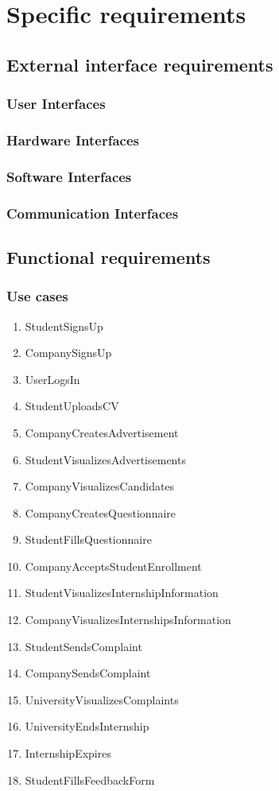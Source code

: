 \chapter{Specific requirements}

\section{External interface requirements}
\subsection{User Interfaces}
\subsection{Hardware Interfaces}
\subsection{Software Interfaces}
\subsection{Communication Interfaces}

\section{Functional requirements}

\subsection{Use cases}

\begin{enumerate}[label=\textbf{UC\arabic* -}]
    \item StudentSignsUp
    \item CompanySignsUp
    \item UserLogsIn
    \item StudentUploadsCV
    \item CompanyCreatesAdvertisement
    \item StudentVisualizesAdvertisements
    \item CompanyVisualizesCandidates
    \item CompanyCreatesQuestionnaire
    \item StudentFillsQuestionnaire
    \item CompanyAcceptsStudentEnrollment
    \item StudentVisualizesInternshipInformation
    \item CompanyVisualizesInternshipsInformation
    \item StudentSendsComplaint
    \item CompanySendsComplaint
    \item UniversityVisualizesComplaints
    \item UniversityEndsInternship
    \item InternshipExpires
    \item StudentFillsFeedbackForm
\end{enumerate}

